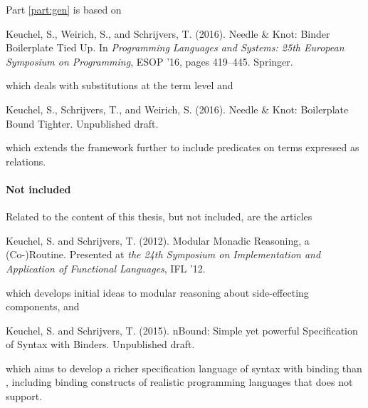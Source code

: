 {Part \ref{part:gen} is based on

\begin{center}
  \begin{minipage}{0.85\columnwidth}
    Keuchel, S., Weirich, S., and Schrijvers, T. (2016).
    \newblock Needle {\&} {K}not: {B}inder {B}oilerplate {T}ied {U}p.
    \newblock In {\em Programming Languages and Systems: 25th European Symposium
      on Programming}, ESOP '16, pages 419--445. Springer.
  \end{minipage}
\end{center}
\noindent which deals with substitutions at the term level and
\begin{center}
  \begin{minipage}{0.85\columnwidth}
    Keuchel, S.,  Schrijvers, T., and Weirich, S. (2016).
    \newblock Needle {\&} {K}not: {B}oilerplate {B}ound {T}ighter.
    \newblock Unpublished draft.
  \end{minipage}
\end{center}
\noindent which extends the framework further to include predicates on terms
expressed as relations.


\paragraph{Not included}

Related to the content of this thesis, but not included, are the articles

\begin{center}
  \begin{minipage}{0.85\columnwidth}
    Keuchel, S. and Schrijvers, T. (2012).
    \newblock Modular Monadic Reasoning, a (Co-)Routine.
    \newblock Presented at \emph{the 24th Symposium on Implementation and
      Application of Functional Languages}, IFL '12.
  \end{minipage}
\end{center}
\noindent which develops initial ideas to modular reasoning about side-effecting
components, and

\begin{center}
  \begin{minipage}{0.85\columnwidth}
    Keuchel, S. and Schrijvers, T. (2015).
    n{B}ound: {S}imple yet powerful {S}pecification of {S}yntax
      with {B}inders.
    \newblock Unpublished draft.
  \end{minipage}
\end{center}

\noindent which aims to develop a richer specification language of syntax with
binding than \Knot, including binding constructs of realistic programming
languages that \Knot does not support.

}
